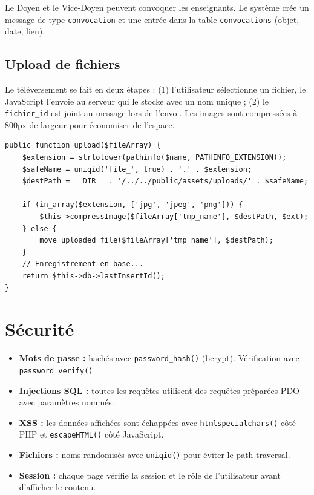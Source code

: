 \documentclass[12pt,a4paper]{article}
\begin{document}
Le Doyen et le Vice-Doyen peuvent convoquer les enseignants. Le syst\`eme
cr\'ee un message de type \texttt{convocation} et une entr\'ee dans la table
\texttt{convocations} (objet, date, lieu).

\subsection{Upload de fichiers}

Le t\'el\'eversement se fait en deux \'etapes : (1) l'utilisateur
s\'electionne un fichier, le JavaScript l'envoie au serveur qui le stocke avec
un nom unique ; (2) le \texttt{fichier\_id} est joint au message lors de
l'envoi. Les images sont compress\'ees \`a 800px de largeur pour \'economiser
de l'espace.

\begin{lstlisting}[style=phpphp, caption=Upload se'curise' de fichier]
public function upload($fileArray) {
    $extension = strtolower(pathinfo($name, PATHINFO_EXTENSION));
    $safeName = uniqid('file_', true) . '.' . $extension;
    $destPath = __DIR__ . '/../../public/assets/uploads/' . $safeName;

    if (in_array($extension, ['jpg', 'jpeg', 'png'])) {
        $this->compressImage($fileArray['tmp_name'], $destPath, $ext);
    } else {
        move_uploaded_file($fileArray['tmp_name'], $destPath);
    }
    // Enregistrement en base...
    return $this->db->lastInsertId();
}
\end{lstlisting}

\section{S\'ecurit\'e}

\begin{itemize}
    \item \textbf{Mots de passe :} hach\'es avec \texttt{password\_hash()}
    (bcrypt). V\'erification avec \texttt{password\_verify()}.
    \item \textbf{Injections SQL :} toutes les requ\^etes utilisent des
    requ\^etes pr\'epar\'ees PDO avec param\`etres nomm\'es.
    \item \textbf{XSS :} les donn\'ees affich\'ees sont \'echapp\'ees avec
    \texttt{htmlspecialchars()} c\^ot\'e PHP et \texttt{escapeHTML()} c\^ot\'e
    JavaScript.
    \item \textbf{Fichiers :} noms randomis\'es avec \texttt{uniqid()} pour
    \'eviter le path traversal.
    \item \textbf{Session :} chaque page v\'erifie la session et le r\^ole
    de l'utilisateur avant d'afficher le contenu.
\end{itemize}
\end{document}
